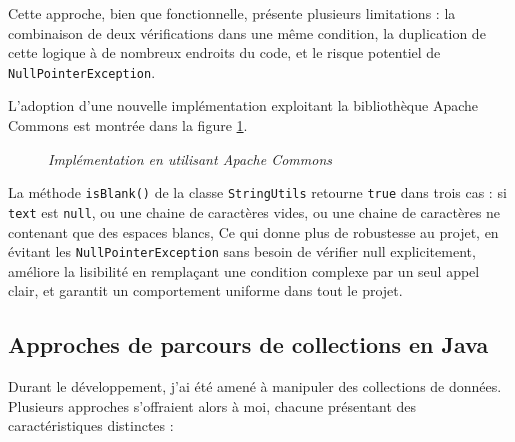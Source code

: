 \documentclass[12pt,a4paper]{report}
\begin{document}
	Cette approche, bien que fonctionnelle, présente plusieurs limitations : la combinaison de deux vérifications dans une même condition, la duplication de cette logique à de nombreux endroits du code, et le risque potentiel de \verb|NullPointerException|.
	
	L'adoption d'une nouvelle implémentation exploitant la bibliothèque Apache Commons est montrée dans la figure \ref{fig:after-string-utils}.
	
	\begin{figure}[H]
		\centering
		\caption{\textit{Implémentation en utilisant Apache Commons}}
		\label{fig:after-string-utils}
	\end{figure}
	
	La méthode \verb|isBlank()| de la classe \verb|StringUtils| retourne \verb|true| dans trois cas : si \verb|text| est \verb|null|, ou une chaine de caractères vides, ou une chaine de caractères ne contenant que des espaces blancs, Ce qui donne plus de robustesse au projet, en évitant les \verb|NullPointerException| sans besoin de vérifier null explicitement, améliore la lisibilité en remplaçant une condition complexe par un seul appel clair, et garantit un comportement uniforme dans tout le projet.
	
	\subsection{Approches de parcours de collections en Java}
	
	Durant le développement, j'ai été amené à manipuler des collections de données. Plusieurs approches s'offraient alors à moi, chacune présentant des caractéristiques distinctes :
	
\end{document}
